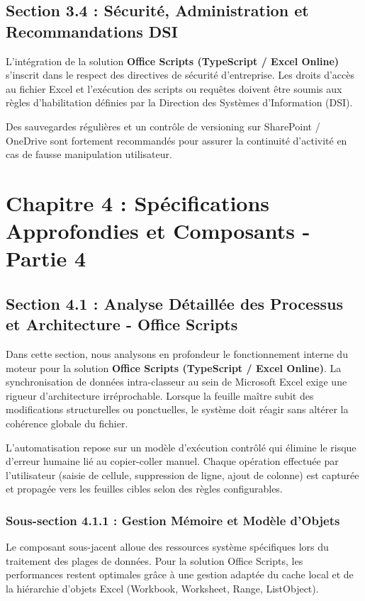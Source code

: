 \documentclass[12pt,a4paper]{report}
\begin{document}
\section{Section 3.4 : Sécurité, Administration et Recommandations DSI}
L'intégration de la solution \textbf{Office Scripts (TypeScript / Excel Online)} s'inscrit dans le respect des directives de sécurité d'entreprise. Les droits d'accès au fichier Excel et l'exécution des scripts ou requêtes doivent être soumis aux règles d'habilitation définies par la Direction des Systèmes d'Information (DSI).

Des sauvegardes régulières et un contrôle de versioning sur SharePoint / OneDrive sont fortement recommandés pour assurer la continuité d'activité en cas de fausse manipulation utilisateur.


\chapter{Chapitre 4 : Spécifications Approfondies et Composants - Partie 4}

\section{Section 4.1 : Analyse Détaillée des Processus et Architecture - Office Scripts}
Dans cette section, nous analysons en profondeur le fonctionnement interne du moteur pour la solution \textbf{Office Scripts (TypeScript / Excel Online)}. La synchronisation de données intra-classeur au sein de Microsoft Excel exige une rigueur d'architecture irréprochable. Lorsque la feuille maître subit des modifications structurelles ou ponctuelles, le système doit réagir sans altérer la cohérence globale du fichier.

L'automatisation repose sur un modèle d'exécution contrôlé qui élimine le risque d'erreur humaine lié au copier-coller manuel. Chaque opération effectuée par l'utilisateur (saisie de cellule, suppression de ligne, ajout de colonne) est capturée et propagée vers les feuilles cibles selon des règles configurables.


\subsection{Sous-section 4.1.1 : Gestion Mémoire et Modèle d'Objets}
Le composant sous-jacent alloue des ressources système spécifiques lors du traitement des plages de données. Pour la solution Office Scripts, les performances restent optimales grâce à une gestion adaptée du cache local et de la hiérarchie d'objets Excel (Workbook, Worksheet, Range, ListObject).
\end{document}
